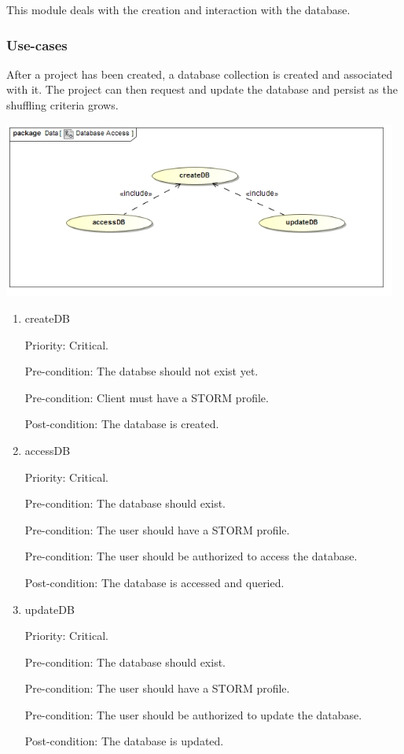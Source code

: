 This module deals with the creation and interaction with the database.

\subsubsection{Use-cases}
After a project has been created, a database collection is created and associated with it. The project can then request and update the database and persist as the shuffling criteria grows.\par
\includegraphics[width=13cm]{./graphics/databaseAccessUseCase.jpg}
    \rule{0\linewidth}{0.15\linewidth}\par
\begin{enumerate}
\item createDB\par
Priority: Critical.\par
Pre-condition: The databse should not exist yet.\par
Pre-condition: Client must have a STORM profile.\par
Post-condition: The database is created.\par

\item accessDB\par
Priority: Critical.\par
Pre-condition: The database should exist.\par
Pre-condition: The user should have a STORM profile.\par
Pre-condition: The user should be authorized to access the database.\par
Post-condition: The database is accessed and queried.\par

\item updateDB\par
Priority: Critical.\par
Pre-condition: The database should exist.\par
Pre-condition: The user should have a STORM profile.\par
Pre-condition: The user should be authorized to update the database.\par
Post-condition: The database is updated.\par

\end{enumerate}